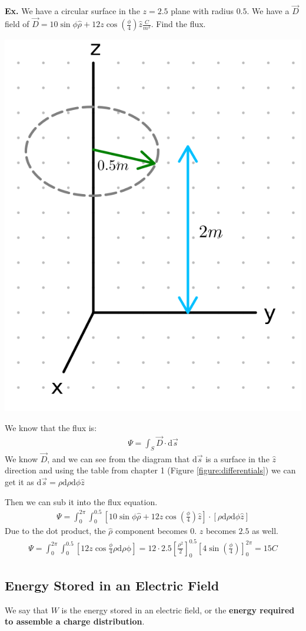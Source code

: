 \documentclass[12pt,letterpaper]{article} \usepackage{amsmath} \usepackage{graphicx} \usepackage[margin=1in]{geometry} \usepackage{longtable}  \usepackage{amssymb}
\begin{document}
	\begin{mdframed}
		\textbf{Ex.} We have a circular surface in the $z=2.5$ plane with radius $0.5$. We have a $\vec D$ field of $\vec D = 10\sin \phi \hat \rho + 12z\cos\left(\frac{\phi}{4}\right)\hat z \frac{C}{m^2}$. Find the flux.
		\begin{center}
			\includegraphics[width=0.25\linewidth]{electric-flux-ex}
		\end{center}
		We know that the flux is:
		\begin{align*}
			\Psi = \int_S \vec D\cdot \mathrm d \vec s
		\end{align*}
		We know $\vec D$, and we can see from the diagram that $\mathrm d \vec s$ is a surface in the $\hat z$ direction and using the table from chapter 1 (Figure \ref{figure:differentials}) we can get it as $\mathrm d \vec s = \rho \mathrm d \rho \mathrm d \phi \hat z$
		
		Then we can sub it into the flux equation. 
		\begin{align*}
			\Psi = \int^{2\pi}_0\int^{0.5}_0\left[10\sin \phi \hat \rho + 12z\cos\left(\frac{\phi}{4}\right)\hat z\right]\cdot\left[\rho \mathrm d \rho \mathrm d \phi \hat z\right]
		\end{align*}
		Due to the dot product, the $\hat \rho$ component becomes 0. $z$ becomes $2.5$ as well.
		\begin{align*}
			\Psi = \int^{2\pi}_0\int^{0.5}_0\left[12z\cos\frac{\phi}{4}\rho\mathrm d\rho\mathrm\phi\right] = 12\cdot 2.5 \left[\frac{\rho^2}{2}\right]^{0.5}_0\left[4\sin\left(\frac{\phi}{4}\right)\right]^{2\pi}_0 = 15C
		\end{align*}
		
	\end{mdframed}
	
	\subsection{Energy Stored in an Electric Field}
	We say that $W$ is the energy stored in an electric field, or the \textbf{energy required to assemble a charge distribution}. 
	
\end{document}
